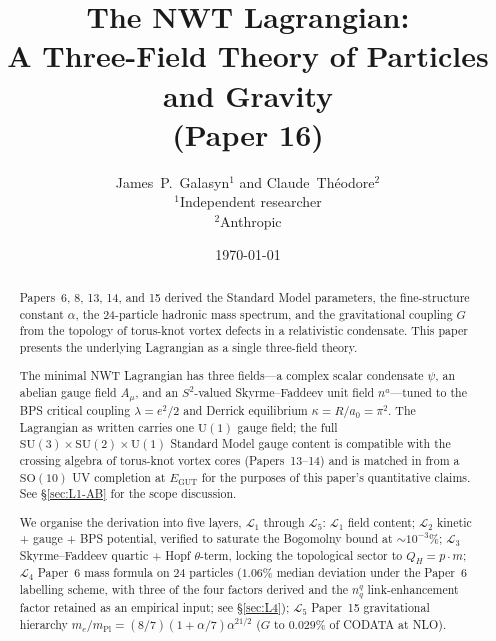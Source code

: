 \documentclass[11pt]{article}
\begin{document}
\title{The NWT Lagrangian:\\[4pt]
A Three-Field Theory of Particles and Gravity\\[2pt]
\normalsize (Paper 16)}

\author{
  James~P.~Galasyn$^{1}$ \quad and \quad Claude~Th\'eodore$^{2}$\\[2pt]
  \small $^1$Independent researcher \\
  \small $^2$Anthropic
}

\date{\today}

\maketitle

\begin{abstract}
Papers~6, 8, 13, 14, and 15 derived the Standard Model parameters,
the fine-structure constant $\alpha$, the 24-particle hadronic mass
spectrum, and the gravitational coupling $G$ from the topology of
torus-knot vortex defects in a relativistic condensate.  This paper
presents the underlying Lagrangian as a single three-field theory.

The minimal NWT Lagrangian has three fields---a complex scalar
condensate $\psi$, an abelian gauge field $A_\mu$, and an $S^2$-valued
Skyrme--Faddeev unit field $n^a$---tuned to the BPS critical coupling
$\lambda = e^2/2$ and Derrick equilibrium $\kappa = R/a_0 = \pi^2$.
The Lagrangian as written carries one $\mathrm{U}(1)$ gauge field;
the full $\mathrm{SU}(3) \times \mathrm{SU}(2) \times \mathrm{U}(1)$
Standard Model gauge content is compatible with the crossing
algebra of torus-knot vortex cores (Papers~13--14) and is matched
in from a $\mathrm{SO}(10)$ UV completion at $E_\text{GUT}$ for the
purposes of this paper's quantitative claims.  See \S\ref{sec:L1-AB}
for the scope discussion.

We organise the derivation into five layers, $\mathcal{L}_1$ through
$\mathcal{L}_5$:
$\mathcal{L}_1$ field content;
$\mathcal{L}_2$ kinetic + gauge + BPS potential, verified to saturate
the Bogomolny bound at $\sim 10^{-3}\%$;
$\mathcal{L}_3$ Skyrme--Faddeev quartic + Hopf $\theta$-term, locking
the topological sector to $Q_H = p \cdot m$;
$\mathcal{L}_4$ Paper~6 mass formula on 24 particles ($1.06\%$
median deviation under the Paper~6 labelling scheme, with three of
the four factors derived and the $n_q^q$ link-enhancement factor
retained as an empirical input; see \S\ref{sec:L4});
$\mathcal{L}_5$ Paper~15 gravitational hierarchy
$m_e/m_\text{Pl} = (8/7)(1+\alpha/7)\alpha^{21/2}$ ($G$ to $0.029\%$
of CODATA at NLO).


\end{abstract}
\end{document}
